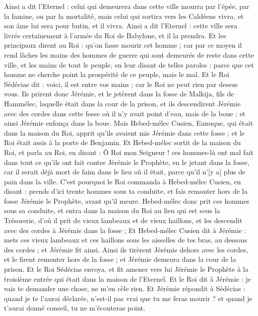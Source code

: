 \begin{multicols}{2}
Ainsi a dit l'Eternel : celui qui demeurera dans cette ville mourra par l'épée, par la famine, ou par la mortalité, mais celui qui sortira vers les Caldéens vivra, et son âme lui sera pour butin, et il vivra.
Ainsi a dit l'Eternel : cette ville sera livrée certainement à l'armée du Roi de Babylone, et il la prendra.
Et les principaux dirent au Roi : qu'on fasse mourir cet homme ; car par ce moyen il rend lâches les mains des hommes de guerre qui sont demeurés de reste dans cette ville, et les mains de tout le peuple, en leur disant de telles paroles ; parce que cet homme ne cherche point la prospérité de ce peuple, mais le mal.
Et le Roi Sédécias dit : voici, il est entre vos mains ; car le Roi ne peut rien par dessus vous.
Ils prirent donc Jérémie, et le jetèrent dans la fosse de Malkija, fils de Hammélec, laquelle était dans la cour de la prison, et ils descendirent Jérémie avec des cordes dans cette fosse où il n'y avait point d'eau, mais de la boue ; et ainsi Jérémie enfonça dans la boue.
Mais Hebed-mélec Cusien, Eunuque, qui était dans la maison du Roi, apprit qu'ils avaient mis Jérémie dans cette fosse ; et le Roi était assis à la porte de Benjamin.
Et Hebed-mélec sortit de la maison du Roi, et parla au Roi, en disant :
Ô Roi mon Seigneur ! ces hommes-là ont mal fait dans tout ce qu'ils ont fait contre Jérémie le Prophète, en le jetant dans la fosse, car il serait déjà mort de faim dans le lieu où il était, parce qu'il n'[y a] plus de pain dans la ville.
C'est pourquoi le Roi commanda à Hebed-mélec Cusien, en disant : prends d'ici trente hommes sous ta conduite, et fais remonter hors de la fosse Jérémie le Prophète, avant qu'il meure.
Hebed-mélec donc prit ces hommes sous sa conduite, et entra dans la maison du Roi au lieu qui est sous la Trésorerie, d'où il prit de vieux lambeaux et de vieux haillons, et les descendit avec des cordes à Jérémie dans la fosse ;
Et Hebed-mélec Cusien dit à Jérémie : mets ces vieux lambeaux et ces haillons sous les aisselles de tes bras, au dessous des cordes ; et Jérémie fit ainsi.
Ainsi ils tirèrent Jérémie dehors avec les cordes, et le firent remonter hors de la fosse ; et Jérémie demeura dans la cour de la prison.
Et le Roi Sédécias envoya, et fit amener vers lui Jérémie le Prophète à la troisième entrée qui était dans la maison de l'Eternel. Et le Roi dit à Jérémie : je vais te demander une chose, ne m'en cèle rien.
Et Jérémie répondit à Sédécias : quand je te l'aurai déclarée, n'est-il pas vrai que tu me feras mourir ? et quand je t'aurai donné conseil, tu ne m'écouteras point.

\end{multicols}
